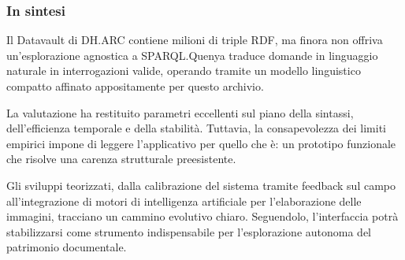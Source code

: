 \subsubsection{In sintesi}\label{sec:conclusioni_finali}

Il Datavault di DH.ARC contiene milioni di triple RDF, ma finora non offriva un'esplorazione agnostica a SPARQL.\@ Quenya traduce domande in linguaggio naturale in interrogazioni valide, operando tramite un modello linguistico compatto affinato appositamente per questo archivio.

La valutazione ha restituito parametri eccellenti sul piano della sintassi, dell'efficienza temporale e della stabilità. Tuttavia, la consapevolezza dei limiti empirici impone di leggere l'applicativo per quello che è: un prototipo funzionale che risolve una carenza strutturale preesistente. 

Gli sviluppi teorizzati, dalla calibrazione del sistema tramite feedback sul campo all'integrazione di motori di intelligenza artificiale per l'elaborazione delle immagini, tracciano un cammino evolutivo chiaro. Seguendolo, l'interfaccia potrà stabilizzarsi come strumento indispensabile per l'esplorazione autonoma del patrimonio documentale.